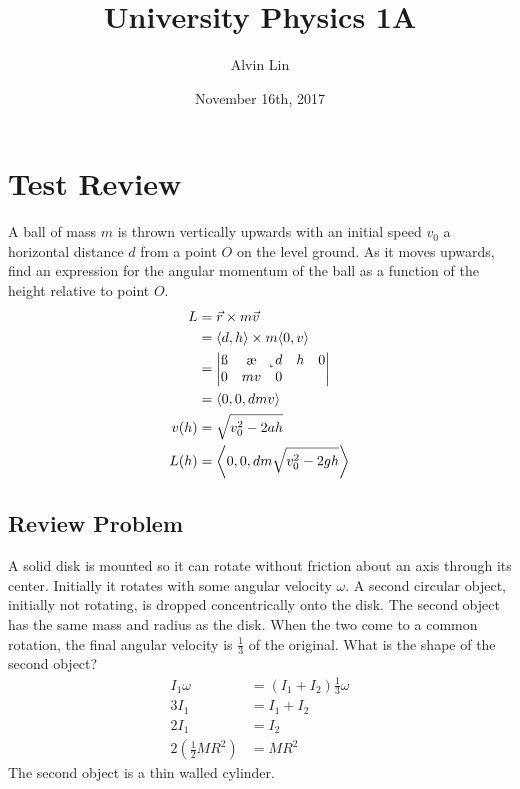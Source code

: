 \documentclass{math}
\title{University Physics 1A}
\author{Alvin Lin}
\date{November 16th, 2017}
\begin{document}
\maketitle

\section*{Test Review}
A ball of mass \( m \) is thrown vertically upwards with an initial speed
\( v_0 \) a horizontal distance \( d \) from a point \( O \) on the level
ground. As it moves upwards, find an expression for the angular momentum of
the ball as a function of the height relative to point \( O \).
\begin{align*}
  L &= \vec{r}\times m\vec{v} \\
  &= \langle d,h\rangle\times m\langle0,v\rangle \\
  &= \begin{vmatrix}
    \i & \j & \k \\
    d & h & 0 \\
    0 & mv & 0
  \end{vmatrix} \\
  &= \langle0,0,dmv\rangle \\
  v(h) &= \sqrt{v_0^2-2ah} \\
  L(h) &= \left\langle0,0,dm\sqrt{v_0^2-2gh}\right\rangle
\end{align*}

\subsection*{Review Problem}
A solid disk is mounted so it can rotate without friction about an axis through
its center. Initially it rotates with some angular velocity \( \omega \). A
second circular object, initially not rotating, is dropped concentrically onto
the disk. The second object has the same mass and radius as the disk. When the
two come to a common rotation, the final angular velocity is \( \frac{1}{3} \)
of the original. What is the shape of the second object?
\begin{align*}
  I_1\omega &= (I_1+I_2)\frac{1}{3}\omega \\
  3I_1 &= I_1+I_2 \\
  2I_1 &= I_2 \\
  2(\frac{1}{2}MR^2) &= MR^2
\end{align*}
The second object is a thin walled cylinder.
\end{document}
